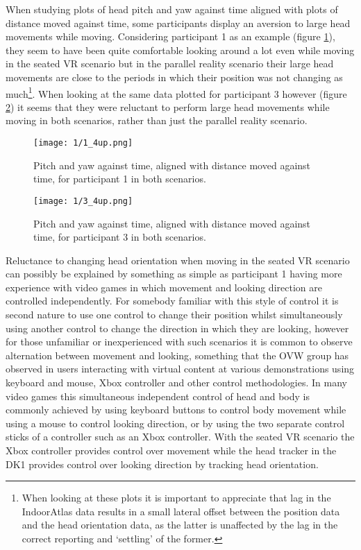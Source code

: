 
When studying plots of head pitch and yaw against time aligned with plots of distance moved against time, some participants display an aversion to large head movements while moving. Considering participant 1 as an example (figure \ref{1_4up.png}), they seem to have been quite comfortable looking around a lot even while moving in the seated VR scenario but in the parallel reality scenario their large head movements are close to the periods in which their position was not changing as much\footnote{When looking at these plots it is important to appreciate that lag in the IndoorAtlas data results in a small lateral offset between the position data and the head orientation data, as the latter is unaffected by the lag in the correct reporting and `settling' of the former.}. When looking at the same data plotted for participant 3 however (figure \ref{3_4up.png}) it seems that they were reluctant to perform large head movements while moving in both scenarios, rather than just the parallel reality scenario.

\begin{figure}
	\begin{center}
	\texttt{[image: 1/1\_4up.png]}
	\caption{Pitch and yaw against time, aligned with distance moved against time, for participant 1 in both scenarios.}
	\label{1_4up.png}
	\end{center}
\end{figure}

\begin{figure}
	\begin{center}
	\texttt{[image: 1/3\_4up.png]}
	\caption{Pitch and yaw against time, aligned with distance moved against time, for participant 3 in both scenarios.}
	\label{3_4up.png}
	\end{center}
\end{figure}

Reluctance to changing head orientation when moving in the seated VR scenario can possibly be explained by something as simple as participant 1 having more experience with video games in which movement and looking direction are controlled independently. For somebody familiar with this style of control it is second nature to use one control to change their position whilst simultaneously using another control to change the direction in which they are looking, however for those unfamiliar or inexperienced with such scenarios it is common to observe alternation between movement and looking, something that the OVW group has observed in users interacting with virtual content at various demonstrations using keyboard and mouse, Xbox controller and other control methodologies. In many video games this simultaneous independent control of head and body is commonly achieved by using keyboard buttons to control body movement while using a mouse to control looking direction, or by using the two separate control sticks of a controller such as an Xbox controller. With the seated VR scenario the Xbox controller provides control over movement while the head tracker in the DK1 provides control over looking direction by tracking head orientation.

